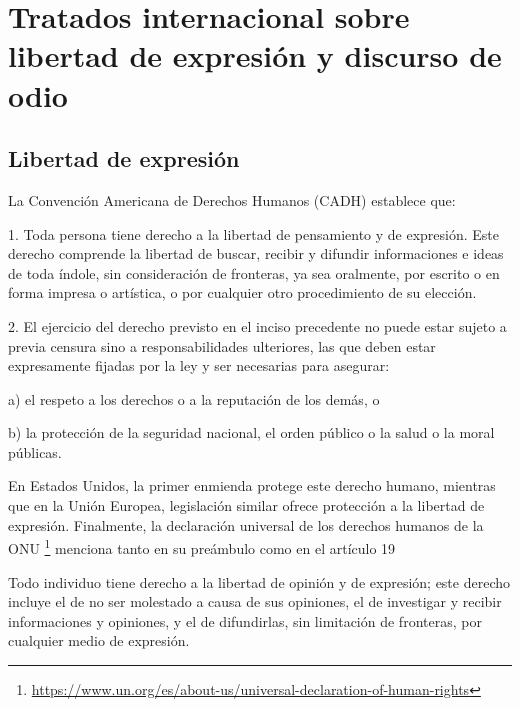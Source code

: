 
\section{Tratados internacional sobre libertad de expresión y discurso de odio}
\label{app:tratados-internacionales}

\subsection{Libertad de expresión}

La Convención Americana de Derechos Humanos (CADH) establece que:

\begin{displayquote}

    1. Toda persona tiene derecho a la libertad de pensamiento y de expresión.  Este derecho comprende la libertad de buscar, recibir y difundir informaciones e ideas de toda índole, sin consideración de fronteras, ya sea oralmente, por escrito o en forma impresa o artística, o por cualquier otro procedimiento de su elección.

    2. El ejercicio del derecho previsto en el inciso precedente no puede estar sujeto a previa censura sino a responsabilidades ulteriores, las que deben estar expresamente fijadas por la ley y ser necesarias para asegurar:

    a)  el respeto a los derechos o a la reputación de los demás, o

    b) la protección de la seguridad nacional, el orden público o la salud o la moral públicas.
\end{displayquote}

En Estados Unidos, la primer enmienda protege este derecho humano, mientras que en la Unión Europea, legislación similar ofrece protección a la libertad de expresión. Finalmente, la declaración universal de los derechos humanos de la ONU \footnote{\url{https://www.un.org/es/about-us/universal-declaration-of-human-rights}} menciona tanto en su preámbulo como en el artículo 19

\begin{displayquote}
    Todo individuo tiene derecho a la libertad de opinión y de expresión; este derecho incluye el de no ser molestado a causa de sus opiniones, el de investigar y recibir informaciones y opiniones, y el de difundirlas, sin limitación de fronteras, por cualquier medio de expresión.
\end{displayquote}


